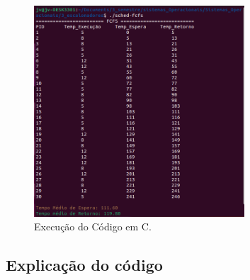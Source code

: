 \documentclass[
	12pt,				%
	openright,			%
	oneside,			%
	a4paper,			%
	chapter=TITLE,		%
	english,			%
	french,				%
	spanish,			%
	brazil				%
	]{abntex2}
\theoremstyle{definition}
\begin{document}
\begin{figure}[H]
    \centering
    \includegraphics[width=0.7\textwidth]{imagens/fifo_run.png}
    \caption{Execução do Código em C.}
    \label{fig:fifo_run}
\end{figure}

\subsection{Explicação do código}
\end{document}

